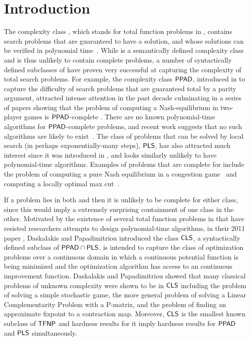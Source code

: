 \chapter{Introduction}

The complexity class \TFNP, which stands for total function problems in
\NP, contains search problems that are guaranteed to have a solution, and whose
solutions can be verified in polynomial time~\cite{megiddo1991total}.
%
While \TFNP is a semantically defined complexity class and is thus unlikely to
contain complete problems, a number of syntactically defined subclasses of
\TFNP have proven very successful at capturing the complexity of total search 
problems.
For example, the complexity class $\mathsf{PPAD}$, introduced in
\cite{papadimitriou1994complexity} to capture the difficulty of search problems
that are guaranteed total by a parity argument, attracted intense attention in
the past decade culminating in a series of papers showing that the problem of
computing a Nash-equilibrium in two-player games is $\mathsf{PPAD}$-complete
\cite{chen2009settling,daskalakis2009complexity}. There are no known
polynomial-time algorithms for $\mathsf{PPAD}$-complete problems, and recent work
suggests that no such algorithms are likely to exist~\cite{bitansky2015cryptographic,garg2016revisiting}. 
The class of problems that
can be solved by local search (in perhaps exponentially-many steps), $\mathsf{PLS}$,
has also attracted much interest since it was introduced in
\cite{johnson1988easy}, and looks similarly unlikely to have polynomial-time
algorithms. Examples of problems that are complete for \PLS include the problem
of computing a pure Nash equilibrium in a congestion
game~\cite{fabrikant2004complexity} and computing a locally optimal max
cut~\cite{schaffer1991simple}.

If a problem lies in both \PPAD and \PLS then it is unlikely to be complete for 
either class, since this would imply a extremely surprising containment of one class in the other.
Motivated by the existence of several total function problems in \PPADPLS
that have resisted researchers attempts to design polynomial-time algorithms,
in their 2011 paper \cite{daskalakis2011continuous}, Daskalakis and Papadimitriou introduced
the class $\mathsf{CLS}$, a syntactically defined subclass of $\mathsf{PPAD} \cap \mathsf{PLS}$.
\CLS is intended to capture the class of optimization problems over a continuous
domain in which a continuous potential function is being minimized and the
optimization algorithm has access to an continuous improvement function.
Daskalakis and Papadimitriou showed that many classical problems of unknown
complexity were shown to be in $\mathsf{CLS}$ including the problem of solving a simple
stochastic game, the more general problem of solving a Linear Complementarity
Problem with a P-matrix, and the problem of finding an approximate fixpoint
to a contraction map. Moreover, $\mathsf{CLS}$ is the smallest known subclass of
$\mathsf{TFNP}$ and hardness results for it imply hardness results for
$\mathsf{PPAD}$ and $\mathsf{PLS}$ simultaneously. 

